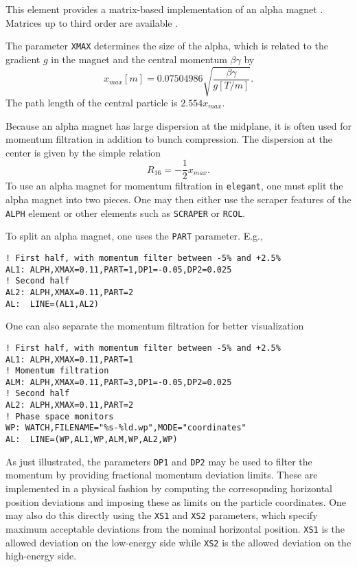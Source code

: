 This element provides a matrix-based implementation of an alpha magnet \cite{Enge}. 
Matrices up to third order are available \cite{Borland_thesis}.

The parameter {\tt XMAX} determines the size of the alpha, which is related
to the gradient $g$ in the magnet and the central momentum $\beta\gamma$ by
\begin{equation}
x_{max} [m] = 0.07504986 \sqrt{\frac{\beta\gamma}{g [T/m]}}.
\end{equation}
The path length of the central particle is $2.554 x_{max}$.

Because an alpha magnet has large dispersion at the midplane, it is often used
for momentum filtration in addition to bunch compression.  The dispersion at the
center is given by the simple relation 
\begin{equation}
R_{16} = -\frac{1}{2} x_{max}.
\end{equation}
To use an alpha magnet for momentum filtration in {\tt elegant}, one must split the
alpha magnet into two pieces.  One may then either use the scraper features of the
{\tt ALPH} element or other elements such as {\tt SCRAPER} or {\tt RCOL}.

To split an alpha magnet, one uses the {\tt PART} parameter.  E.g.,
\begin{verbatim}
! First half, with momentum filter between -5% and +2.5%
AL1: ALPH,XMAX=0.11,PART=1,DP1=-0.05,DP2=0.025
! Second half 
AL2: ALPH,XMAX=0.11,PART=2
AL:  LINE=(AL1,AL2)
\end{verbatim}

One can also separate the momentum filtration for better visualization
\begin{verbatim}
! First half, with momentum filter between -5% and +2.5%
AL1: ALPH,XMAX=0.11,PART=1
! Momentum filtration
ALM: ALPH,XMAX=0.11,PART=3,DP1=-0.05,DP2=0.025
! Second half 
AL2: ALPH,XMAX=0.11,PART=2
! Phase space monitors
WP: WATCH,FILENAME="%s-%ld.wp",MODE="coordinates"
AL:  LINE=(WP,AL1,WP,ALM,WP,AL2,WP)
\end{verbatim}

As just illustrated, the parameters {\tt DP1} and {\tt DP2} may be used to filter the
momentum by providing fractional momentum deviation limits.  These are implemented in
a physical fashion by computing the corresopnding horizontal position deviations and
imposing these as limits on the particle coordinates.  One may also do this directly
using the {\tt XS1} and {\tt XS2} parameters, which specify maximum acceptable deviations
from the nominal horizontal position.  {\tt XS1} is the allowed deviation on the low-energy
side while {\tt XS2} is the allowed deviation on the high-energy side.
